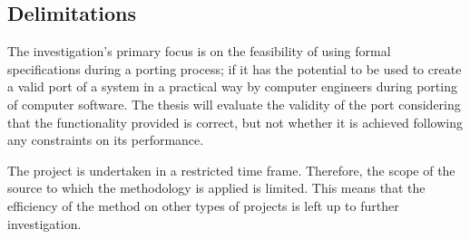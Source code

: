 \subsection{Delimitations}
The investigation's primary focus is on the feasibility of using formal specifications during a porting process; if it has the potential to be used to create a valid port of a system in a practical way by computer engineers during porting of computer software. The thesis will evaluate the validity of the port considering that the functionality provided is correct, but not whether it is achieved following any constraints on its performance.

The project is undertaken in a restricted time frame. Therefore, the scope of the source to which the methodology is applied is limited. This means that the efficiency of the method on other types of projects is left up to further investigation.
